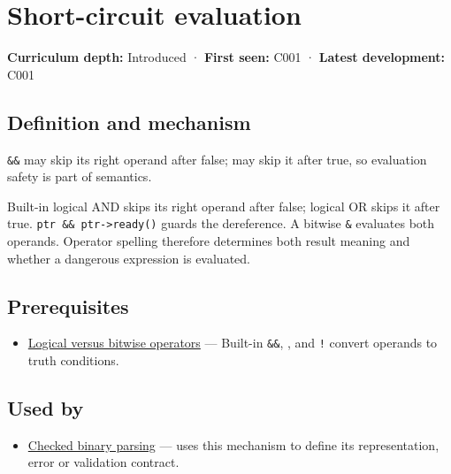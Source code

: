 \hypertarget{appendix-2e245a6fa8d3}{}\label{referencestart:appendix-2e245a6fa8d3}
\section{Short-circuit evaluation}\label{appendix-2e245a6fa8d3-short-circuit-evaluation}

\textbf{Curriculum depth:} Introduced · \textbf{First seen:} C001 · \textbf{Latest development:} C001

\begin{allmightroledefinition}

\subsection{Definition and mechanism}\label{appendix-2e245a6fa8d3-definition-and-mechanism}

\texttt{\&\&} may skip its right operand after false; \texttt{\textbar{}\textbar{}} may skip it after true, so evaluation safety is part of semantics.

\end{allmightroledefinition}

Built-in logical AND skips its right operand after false; logical OR skips it after true. \texttt{ptr\ \&\&\ ptr-\textgreater{}ready()} guards the dereference. A bitwise \texttt{\&} evaluates both operands. Operator spelling therefore determines both result meaning and whether a dangerous expression is evaluated.

\subsection{Prerequisites}\label{appendix-2e245a6fa8d3-prerequisites}

\begin{itemize}
\tightlist
\item
  \hyperref[appendix-fe6b457d68d8]{Logical versus bitwise operators} --- Built-in \texttt{\&\&}, \texttt{\textbar{}\textbar{}}, and \texttt{!} convert operands to truth conditions.
\end{itemize}

\subsection{Used by}\label{appendix-2e245a6fa8d3-used-by}

\begin{itemize}
\tightlist
\item
  \hyperref[appendix-652d81568de9]{Checked binary parsing} --- uses this mechanism to define its representation, error or validation contract.
\end{itemize}

